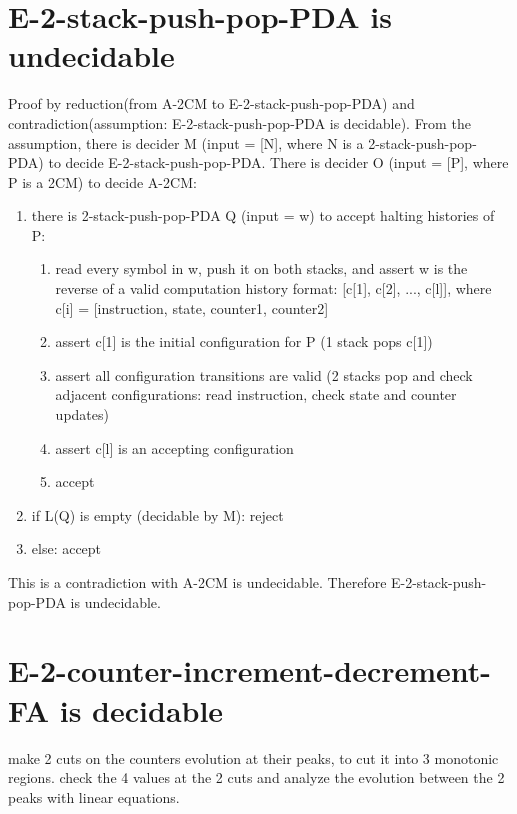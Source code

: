 \documentclass{article}
\begin{document}
\section{E-2-stack-push-pop-PDA is undecidable}
Proof by reduction(from A-2CM to E-2-stack-push-pop-PDA) and 
contradiction(assumption: E-2-stack-push-pop-PDA is decidable).
From the assumption, there is decider M (input = [N], where N is a 
2-stack-push-pop-PDA) to decide E-2-stack-push-pop-PDA.
There is decider O (input = [P], where P is a 2CM) to decide A-2CM:
\begin{enumerate}
	\item there is 2-stack-push-pop-PDA Q (input = w) to accept halting 
	histories of P:
	\begin{enumerate}
		\item read every symbol in w, push it on both stacks, and assert w is the reverse of a valid computation history format: [c[1], c[2], ..., c[l]], where c[i] = [instruction, state, counter1, counter2]
		\item assert c[1] is the initial configuration for P (1 stack pops c[1])
		\item assert all configuration transitions are valid (2 stacks pop and check adjacent configurations: read instruction, check state and counter updates)
		\item assert c[l] is an accepting configuration
		\item accept
	\end{enumerate}
	\item if L(Q) is empty (decidable by M): reject
	\item else: accept
\end{enumerate}
This is a contradiction with A-2CM is undecidable.
Therefore E-2-stack-push-pop-PDA is undecidable.

\section{E-2-counter-increment-decrement-FA is decidable}
make 2 cuts on the counters evolution at their peaks, to cut it into 3 monotonic regions. check the 4 values at the 2 cuts and analyze the evolution between the 2 peaks with linear equations.
\end{document}
